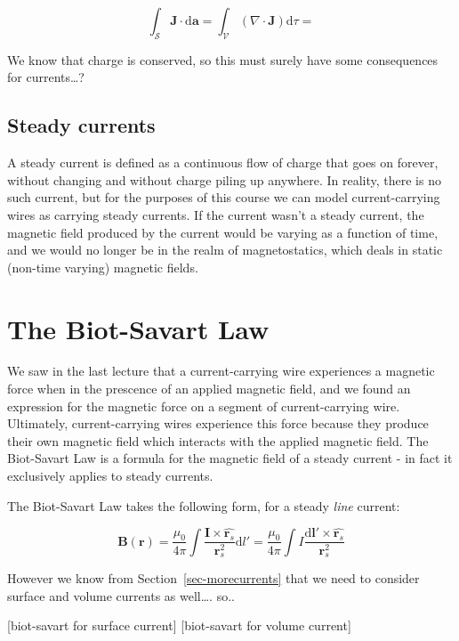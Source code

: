 \documentclass[
  letterpaper,
  DIV=11,
  numbers=noendperiod]{scrreprt}
\begin{document}
\[ \int_{\mathcal{S}} \mathrm{\mathbf{J}}\cdot \mathrm{d}\mathrm{\mathbf{a}}= \int_{\mathcal{V}} (\nabla \cdot \mathrm{\mathbf{J}}) \mathrm{d}\tau =  \]

We know that charge is conserved, so this must surely have some
consequences for currents\ldots?

\subsection{Steady currents}\label{steady-currents}

A steady current is defined as a continuous flow of charge that goes on
forever, without changing and without charge piling up anywhere. In
reality, there is no such current, but for the purposes of this course
we can model current-carrying wires as carrying steady currents. If the
current wasn't a steady current, the magnetic field produced by the
current would be varying as a function of time, and we would no longer
be in the realm of magnetostatics, which deals in static (non-time
varying) magnetic fields.

\section{The Biot-Savart Law}\label{the-biot-savart-law}

We saw in the last lecture that a current-carrying wire experiences a
magnetic force when in the prescence of an applied magnetic field, and
we found an expression for the magnetic force on a segment of
current-carrying wire. Ultimately, current-carrying wires experience
this force because they produce their own magnetic field which interacts
with the applied magnetic field. The Biot-Savart Law is a formula for
the magnetic field of a steady current - in fact it exclusively applies
to steady currents.

The Biot-Savart Law takes the following form, for a steady \emph{line}
current:

\[\mathrm{\mathbf{B}}(\mathrm{\mathbf{r}}) = \frac{\mu_0}{4\pi} \int \frac{\mathrm{\mathbf{I}}\times \hat{\mathrm{\mathbf{r}}_s} }{\mathrm{\mathbf{r}}_s^2} \mathrm{d}l' =  \frac{\mu_0}{4\pi} \int I \frac{\mathrm{d} \mathrm{\mathbf{l}}' \times \hat{\mathrm{\mathbf{r}}_s} }{\mathrm{\mathbf{r}}_s^2} \]

However we know from Section~\ref{sec-morecurrents} that we need to
consider surface and volume currents as well\ldots. so..

{[}biot-savart for surface current{]} {[}biot-savart for volume
current{]}
\end{document}
